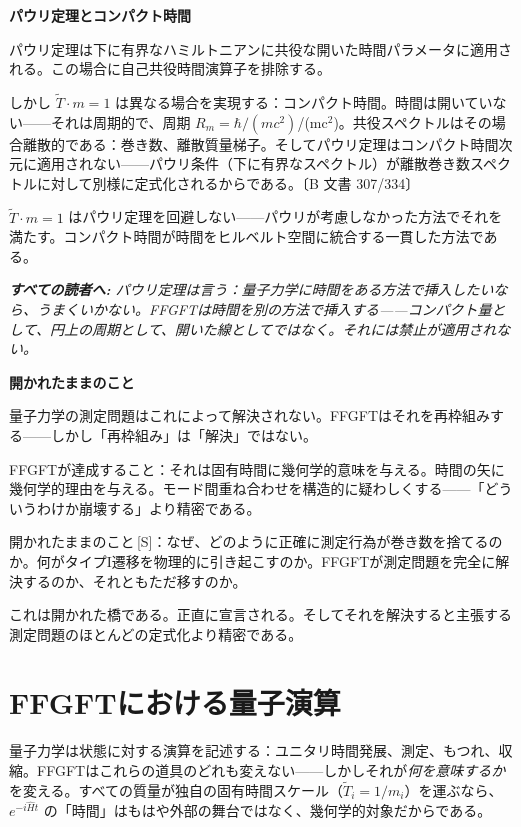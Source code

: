 \documentclass[11pt,openany]{book}
\newcommand{\status}[1]{\penalty10000\,{\tiny\textcolor{gray!70}{[#1]}}}
\newenvironment{laierspur}{%
  \par\vspace{4pt}%
  \noindent\small\itshape\color{blue!60!black}%
  \textbf{すべての読者へ:}\enspace\ignorespaces}{%
  \par\vspace{4pt}\normalsize\normalfont\normalcolor}
\begin{document}
\textbf{パウリ定理とコンパクト時間}

パウリ定理は下に有界なハミルトニアンに共役な開いた時間パラメータに適用される。この場合に自己共役時間演算子を排除する。

しかし $\tilde{T}\cdot m=1$ は異なる場合を実現する：コンパクト時間。時間は開いていない——それは周期的で、周期 $R_m = \hbar/(mc^2)$/(mc$^2$)。共役スペクトルはその場合離散的である：巻き数、離散質量梯子。そしてパウリ定理はコンパクト時間次元に適用されない——パウリ条件（下に有界なスペクトル）が離散巻き数スペクトルに対して別様に定式化されるからである。〔B 文書 307/334〕

$\tilde{T}\cdot m=1$ はパウリ定理を回避しない——パウリが考慮しなかった方法でそれを満たす。コンパクト時間が時間をヒルベルト空間に統合する一貫した方法である。

\begin{laierspur}
パウリ定理は言う：量子力学に時間をある方法で挿入したいなら、うまくいかない。FFGFTは時間を別の方法で挿入する——コンパクト量として、円上の周期として、開いた線としてではなく。それには禁止が適用されない。
\end{laierspur}

\textbf{開かれたままのこと}

量子力学の測定問題はこれによって解決されない。FFGFTはそれを再枠組みする——しかし「再枠組み」は「解決」ではない。

FFGFTが達成すること：それは固有時間に幾何学的意味を与える。時間の矢に幾何学的理由を与える。モード間重ね合わせを構造的に疑わしくする——「どういうわけか崩壊する」より精密である。

開かれたままのこと\status{S}：なぜ、どのように正確に測定行為が巻き数を捨てるのか。何がタイプI遷移を物理的に引き起こすのか。FFGFTが測定問題を完全に解決するのか、それともただ移すのか。

これは開かれた橋である。正直に宣言される。そしてそれを解決すると主張する測定問題のほとんどの定式化より精密である。

\medskip

\chapter{FFGFTにおける量子演算}

量子力学は状態に対する演算を記述する：ユニタリ時間発展、測定、もつれ、収縮。FFGFTはこれらの道具のどれも変えない——しかしそれが\textit{何を意味するか}を変える。すべての質量が独自の固有時間スケール（$\tilde{T}_i = 1/m_i$）を運ぶなら、$e^{-i\hat{H}t}$ の「時間」はもはや外部の舞台ではなく、幾何学的対象だからである。
\end{document}
